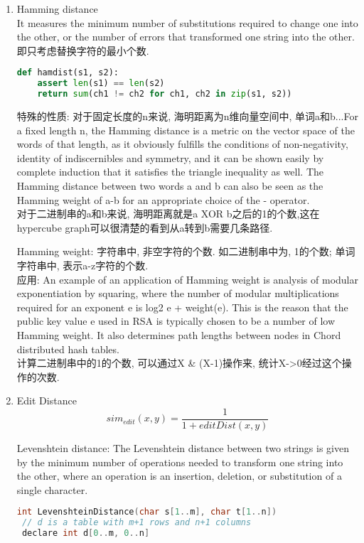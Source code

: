 \documentclass[a4paper,10pt,english]{article}
\begin{document}
\begin{enumerate}
\item{Hamming distance}\\
It measures the minimum number of substitutions required to change one into the other, or the number of errors that transformed one string into the other. 即只考虑替换字符的最小个数.
\begin{lstlisting}[language=python]
def hamdist(s1, s2):
    assert len(s1) == len(s2)
    return sum(ch1 != ch2 for ch1, ch2 in zip(s1, s2))
\end{lstlisting}
特殊的性质: 对于固定长度的n来说, 海明距离为n维向量空间中, 单词a和b...For a fixed length n, the Hamming distance is a metric on the vector space of the words of that length, as it obviously fulfills the conditions of non-negativity, identity of indiscernibles and symmetry, and it can be shown easily by complete induction that it satisfies the triangle inequality as well. The Hamming distance between two words a and b can also be seen as the Hamming weight of a-b for an appropriate choice of the - operator.\\
对于二进制串的a和b来说, 海明距离就是a XOR b之后的1的个数,这在hypercube graph可以很清楚的看到从a转到b需要几条路径.

Hamming weight: 字符串中, 非空字符的个数. 如二进制串中为, 1的个数; 单词字符串中, 表示a-z字符的个数.\\
应用: An example of an application of Hamming weight is analysis of modular exponentiation by squaring, where the number of modular multiplications required for an exponent e is log2 e + weight(e). This is the reason that the public key value e used in RSA is typically chosen to be a number of low Hamming weight. It also determines path lengths between nodes in Chord distributed hash tables. \\
计算二进制串中的1的个数, 可以通过X \& (X-1)操作来, 统计X->0经过这个操作的次数.

\item{Edit Distance}
$$ sim_{edit}(x, y) = \frac{1}{1 + editDist(x,y)} $$

Levenshtein distance: The Levenshtein distance between two strings is given by the minimum number of operations needed to transform one string into the other, where an operation is an insertion, deletion, or substitution of a single character.\\

\begin{lstlisting}[language=C]
int LevenshteinDistance(char s[1..m], char t[1..n])
 // d is a table with m+1 rows and n+1 columns
 declare int d[0..m, 0..n]


\end{lstlisting}
\end{enumerate}
\end{document}
